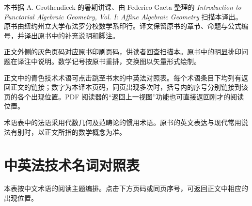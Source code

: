 \documentclass[UTF8,11pt,oneside,openany,fontset=none]{ctexbook}
\begin{document}

\frontmatter
\thispagestyle{plain}
\vspace*{18mm}
\par\bigskip
本书据 A. Grothendieck 的暑期讲课、由 Federico Gaeta 整理的 \textit{Introduction to Functorial Algebraic Geometry, Vol. I: Affine Algebraic Geometry} 扫描本译出。原书由纽约州立大学布法罗分校数学系印行。译文保留原书的章节、命题与公式编号，并译出原书中的补充说明和脚注。

正文外侧的灰色页码对应原书印刷页码，供读者回查扫描本。原书中的明显排印问题在译注中说明。数学记号按原书重排，交换图以矢量形式绘制。

正文中的青色技术术语可点击跳至书末的中英法对照表。每个术语条目下均列有返回正文的链接；数字为本译本页码，同页出现多次时，括号内的序号分别链接到该页的各个出现位置。PDF 阅读器的“返回上一视图”功能也可直接返回刚才的阅读位置。

术语表中的法语采用代数几何及范畴论的惯用术语。原书的英文表达与现代常用说法有别时，以正文所指的数学概念为准。

\vfill
\noindent{\color{Gold}\rule{\linewidth}{0.5pt}}\par\smallskip
{}
\clearpage
\tableofcontents
\mainmatter







\backmatter
\chapter{中英法技术名词对照表}
\label{glossary}
\noindent 本表按中文术语的阅读主题编排。点击下方页码或同页序号，可返回正文中相应的出现位置。\par\bigskip

\end{document}
